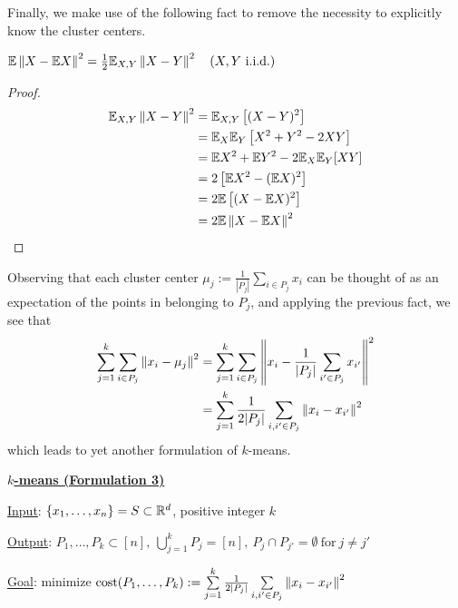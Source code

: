 Finally, we make use of the following fact to remove the necessity to
explicitly know the cluster centers.

\begin{fact}
    $\mathbb{E} \left\lVert X - \mathbb{E} X\right\rVert^2 = \frac{1}{2} \mathbb{E}_{X,Y} \left\lVert X - Y\right\rVert^2
    \quad (X, Y ~\text{i.i.d.})$
\end{fact}

\begin{proof}
    \begin{align*}
        \mathbb{E}_{X,Y} \left\lVert X - Y\right\rVert^2
        &= \mathbb{E}_{X,Y} \left[(X - Y)^2\right] \\
        &= \mathbb{E}_X \mathbb{E}_Y \left[X^2 + Y^2 - 2 X Y\right] \\
        &= \mathbb{E} X^2 + \mathbb{E} Y^2 - 2 \mathbb{E}_X \mathbb{E}_Y [X Y] \\
        &= 2 \left[\mathbb{E} X^2 - (\mathbb{E} X)^2\right] \\
        &= 2 \mathbb{E} \left[(X - \mathbb{E} X)^2\right] \\
        &= 2 \mathbb{E} \left\lVert X - \mathbb{E} X\right\rVert^2
    \end{align*}
\end{proof}

Observing that each cluster center $\mu_j := \frac{1}{|P_j|}
\sum_{i \in P_j} x_i$ can be thought of as an expectation of the points
in belonging to $P_j$, and applying the previous fact, we see that
\begin{align*}
    \sum_{j=1}^{k} \sum_{i \in P_j} \left\lVert x_i - \mu_j\right\rVert^2
    &= \sum_{j=1}^{k} \sum_{i \in P_j} \left\lVert x_i - \frac{1}{|P_j|}
        \sum_{i' \in P_j} x_{i'}\right\rVert^2 \\
    &= \sum_{j=1}^{k} \frac{1}{2 |P_j|} \sum_{i,i' \in P_j}
        \left\lVert x_i - x_{i'}\right\rVert^2
\end{align*}
which leads to yet another formulation of $k$-means.

\begin{mdframed}
    \underline{\textbf{$k$-means (Formulation 3)}}
    
    \vspace{0.5em} \underline{Input}:
    $\{x_1,\ldots,x_n\} = S \subset \mathbb{R}^d$, positive integer $k$
    
    \vspace{0.5em} \underline{Output}: $P_1, \ldots, P_k \subset [n],
    ~\bigcup_{j=1}^k P_j = [n],
    ~P_j \cap P_{j'} = \emptyset ~\text{for}~ j \ne j'$
    
    \vspace{0.5em} \underline{Goal}: minimize
    $\text{cost}(P_1, \ldots, P_k) := \sum\limits_{j=1}^{k}
    \frac{1}{2 |P_j|} \sum\limits_{i,i' \in P_j} \left\lVert x_i - x_{i'}\right\rVert^2$
\end{mdframed}

